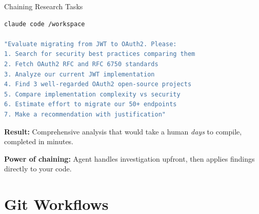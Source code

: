 \documentclass[aspectratio=169,11pt]{beamer}
\begin{document}
\begin{frame}[fragile]{Chaining Research Tasks}
    \begin{lstlisting}[language=bash, basicstyle=\ttfamily\small]
claude code /workspace

"Evaluate migrating from JWT to OAuth2. Please:
1. Search for security best practices comparing them
2. Fetch OAuth2 RFC and RFC 6750 standards
3. Analyze our current JWT implementation
4. Find 3 well-regarded OAuth2 open-source projects
5. Compare implementation complexity vs security
6. Estimate effort to migrate our 50+ endpoints
7. Make a recommendation with justification"
    \end{lstlisting}

    \vspace{0.3cm}
    \textbf{Result:} Comprehensive analysis that would take a human \textit{days} to compile, completed in minutes.

    \vspace{0.2cm}
    \textbf{Power of chaining:} Agent handles investigation upfront, then applies findings directly to your code.

\end{frame}

\section{Git Workflows}
\end{document}
